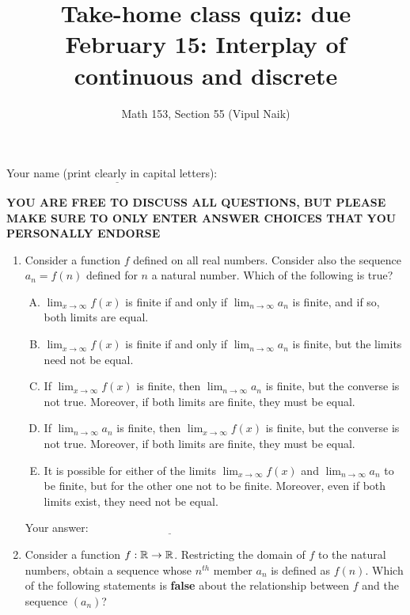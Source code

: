 \documentclass[10pt]{amsart}
\title{Take-home class quiz: due February 15: Interplay of continuous and discrete}
\author{Math 153, Section 55 (Vipul Naik)}
\begin{document}
\maketitle

Your name (print clearly in capital letters): $\underline{\qquad\qquad\qquad\qquad\qquad\qquad\qquad\qquad\qquad\qquad}$

{\bf YOU ARE FREE TO DISCUSS ALL QUESTIONS, BUT PLEASE MAKE SURE TO
ONLY ENTER ANSWER CHOICES THAT YOU PERSONALLY ENDORSE}

\begin{enumerate}

\item Consider a function $f$ defined on all real numbers. Consider
  also the sequence $a_n = f(n)$ defined for $n$ a natural
  number. Which of the following is true?

  \begin{enumerate}[(A)]
  \item $\lim_{x \to \infty} f(x)$ is finite if and only if $\lim_{n
    \to \infty} a_n$ is finite, and if so, both limits are equal.
  \item $\lim_{x \to \infty} f(x)$ is finite if and only if $\lim_{n
    \to \infty} a_n$ is finite, but the limits need not be equal.
  \item If $\lim_{x \to \infty} f(x)$ is finite, then $\lim_{n \to
    \infty} a_n$ is finite, but the converse is not true. Moreover, if
    both limits are finite, they must be equal.
  \item If $\lim_{n \to \infty} a_n$ is finite, then $\lim_{x \to
    \infty} f(x)$ is finite, but the converse is not true. Moreover, if
    both limits are finite, they must be equal.
  \item It is possible for either of the limits $\lim_{x \to \infty}
    f(x)$ and $\lim_{n \to \infty} a_n$ to be finite, but for the
    other one not to be finite. Moreover, even if both limits exist,
    they need not be equal.
  \end{enumerate}

  \vspace{0.1in}
  Your answer: $\underline{\qquad\qquad\qquad\qquad\qquad\qquad\qquad}$
  \vspace{0.15in}

\item Consider a function $f:\mathbb{R} \to \mathbb{R}$. Restricting the
  domain of $f$ to the natural numbers, obtain a sequence whose
  $n^{th}$ member $a_n$ is defined as $f(n)$. Which of the following
  statements is {\bf false} about the relationship between $f$ and the
  sequence $(a_n)$?


\end{enumerate}
\end{document}

